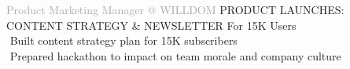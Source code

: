 \begin{cvtable}
{\textcolor{darkgray}{%
    Product Marketing Manager
    \newline @
{W\scriptsize ILL}{D\scriptsize OM}
    }}%
{
}%
{%
{\scriptsize PRODUCT LAUNCHES:
CONTENT STRATEGY
\&
NEWSLETTER
For %
15K Users
} \\
    \textperiodcentered $ $ Built content strategy plan
    for 15K subscribers \\
    \textperiodcentered $ $ Prepared hackathon to impact on team morale and company culture \\
} 


\end{cvtable}
